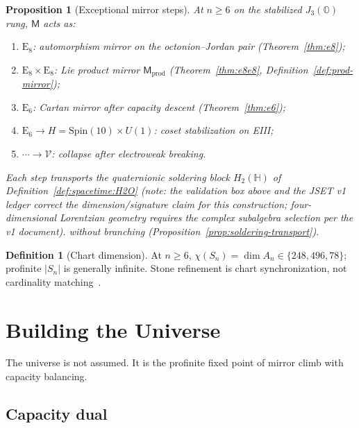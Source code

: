 \documentclass[aps,prd,onecolumn,amsmath,amssymb,nofootinbib,11pt]{revtex4-2}
\numberwithin{equation}{section}
\theoremstyle{plain}
\newtheorem{proposition}[theorem]{Proposition}
\theoremstyle{definition}
\newtheorem{definition}[theorem]{Definition}
\theoremstyle{remark}
\newcommand{\Quat}{\mathbb{H}}
\newcommand{\jalg}{J_3(\mathbb{O})}
\newcommand{\E}[1]{\mathrm{E}_{#1}}
\newcommand{\Spin}{\mathrm{Spin}}
\newcommand{\Void}{\mathcal{V}}
\newcommand{\Mirror}{\mathsf{M}}
\begin{document}
\begin{proposition}[Exceptional mirror steps]\label{prop:climb:exceptional}
At $n\geq6$ on the stabilized $\jalg$ rung, $\Mirror$ acts as:
\begin{enumerate}[label=(\roman*),leftmargin=*]
  \item $\E{8}$: automorphism mirror on the octonion--Jordan pair
    (Theorem~\ref{thm:e8});
  \item $\E{8}\times\E{8}$: Lie product mirror $\Mirror_{\mathrm{prod}}$
    (Theorem~\ref{thm:e8e8}, Definition~\ref{def:prod-mirror});
  \item $\E{6}$: Cartan mirror after capacity descent
    (Theorem~\ref{thm:e6});
  \item $\E{6}\to H=\Spin(10)\times U(1)$: coset stabilization on EIII;
  \item $\cdots\to\Void$: collapse after electroweak breaking.
\end{enumerate}
Each step transports the quaternionic soldering block $H_2(\Quat)$ of
Definition~\ref{def:spacetime:H2O} (note: the validation box above and the JSET v1 ledger correct the dimension/signature claim for this construction; four-dimensional Lorentzian geometry requires the complex subalgebra selection per the v1 document). without branching
(Proposition~\ref{prop:soldering-transport}).
\end{proposition}

\begin{definition}[Chart dimension]\label{def:chart-dim}
At $n\geq6$, $\chi(S_n)=\dim A_n\in\{248,496,78\}$; profinite $|S_n|$ is
generally infinite. Stone refinement is chart synchronization, not cardinality
matching~\cite{Stone1936}.
\end{definition}%
\section{Building the Universe}
\label{sec:universe}

The universe is not assumed. It is the profinite fixed point of mirror climb
with capacity balancing.

\subsection{Capacity dual}
\label{sec:universe:capacity}
\end{document}

